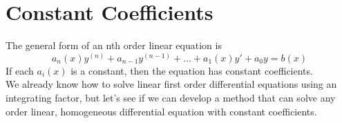 \section{Constant Coefficients}
The general form of an nth order linear equation is
\begin{equation*}
	a_n(x)y^{(n)} + a_{n-1}y^{(n-1)} + \ldots + a_1(x)y' + a_0y = b(x)
\end{equation*}
If each $a_i(x)$ is a constant, then the equation has constant coefficients.\\

\noindent
We already know how to solve linear first order differential equations using an integrating factor, but let's see if we can develop a method that can solve any order linear, homogeneous differential equation with constant coefficients.

\ifodd{}\fi

